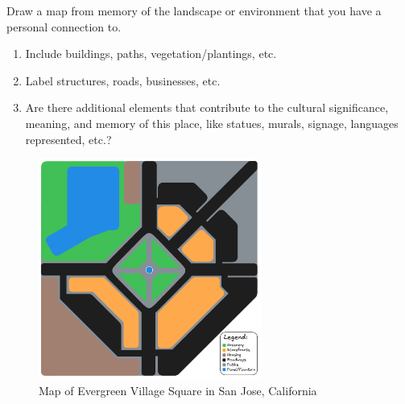 

%
%

\newcommand{\hmwkTitle}{Week 01 Discussion}
\newcommand{\hmwkDueDate}{September 02, 2024}
\newcommand{\hmwkDueTime}{11:59 PM}
\newcommand{\hmwkClass}{HISP 200}
\newcommand{\hmwkClassTime}{Section 0101}
\newcommand{\hmwkClassInstructor}{Prof. Woehlke}
\newcommand{\hmwkAuthorName}{\textbf{Vai Srivastava}}



\maketitle

\pagebreak

\begin{homeworkProblem}

	Draw a map from memory of the landscape or environment that you have a personal connection to.
	\begin{enumerate}
		\item Include buildings, paths, vegetation/plantings, etc.
		\item Label structures, roads, businesses, etc.
		\item Are there additional elements that contribute to the cultural significance, meaning, and memory of this place, like statues, murals, signage, languages represented, etc.?
	\end{enumerate}

	\solution

	\begin{figure}[h]
		\begin{center}
			\includegraphics[width=0.65\textwidth]{images/map.png}
		\end{center}
		\caption{Map of Evergreen Village Square in San Jose, California}\label{fig:w01 map}
	\end{figure}


\end{homeworkProblem}

